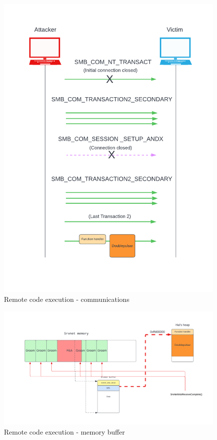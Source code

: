 \begin{figure}[ht!]
    \centering
      \includegraphics[scale=0.5]{images/exploit_7_comm.png}
      \caption{Remote code execution - communications}
\end{figure}

\begin{figure}[ht!]
    \centering
      \includegraphics[scale=0.5]{images/exploit_7_buff.png}
      \caption{Remote code execution - memory buffer}
\end{figure}